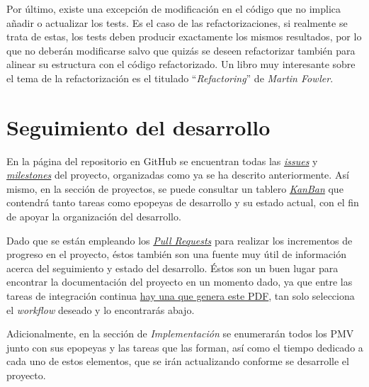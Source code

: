 Por último, existe una excepción de modificación en el código que no implica añadir o actualizar los tests. Es el caso de las refactorizaciones, si realmente se trata de estas, los tests deben producir exactamente los mismos resultados, por lo que no deberán modificarse salvo que quizás se deseen refactorizar también para alinear su estructura con el código refactorizado. Un libro muy interesante sobre el tema de la refactorización es el titulado ``\textit{Refactoring}'' de \textit{Martin Fowler}.

\section{Seguimiento del desarrollo}

En la página del repositorio en GitHub se encuentran todas las \href{https://github.com/Anglepi/My-Many-Reads/issues}{\textit{issues}} y \href{https://github.com/Anglepi/My-Many-Reads/milestones}{\textit{milestones}} del proyecto, organizadas como ya se ha descrito anteriormente. Así mismo, en la sección de proyectos, se puede consultar un tablero \href{https://github.com/users/Anglepi/projects/1}{\textit{KanBan}} que contendrá tanto tareas como epopeyas de desarrollo y su estado actual, con el fin de apoyar la organización del desarrollo.

Dado que se están empleando los \href{https://github.com/Anglepi/My-Many-Reads/pulls}{\textit{Pull Requests}} para realizar los incrementos de progreso en el proyecto, éstos también son una fuente muy útil de información acerca del seguimiento y estado del desarrollo. Éstos son un buen lugar para encontrar la documentación del proyecto en un momento dado, ya que entre las tareas de integración continua \href{https://github.com/Anglepi/My-Many-Reads/actions/workflows/latex-build.yml}{hay una que genera este PDF}, tan solo selecciona el \textit{workflow} deseado y lo encontrarás abajo.

Adicionalmente, en la sección de \textit{Implementación} se enumerarán todos los PMV junto con sus epopeyas y las tareas que las forman, así como el tiempo dedicado a cada uno de estos elementos, que se irán actualizando conforme se desarrolle el proyecto.